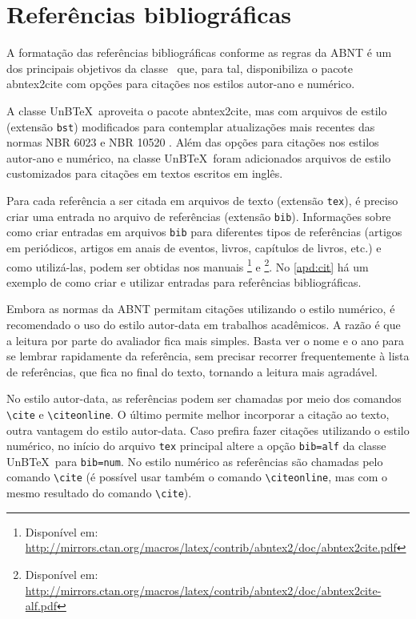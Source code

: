 \section{Referências bibliográficas}\label{sec:referencias}

A formatação das referências bibliográficas conforme as regras da ABNT é um dos principais objetivos da classe \abnTeX\ que, para tal, disponibiliza o pacote \textsf{abntex2cite} com opções para citações nos estilos autor-ano e numérico.

A classe UnB\TeX\ aproveita o pacote \textsf{abntex2cite}, mas com arquivos de estilo (extensão \texttt{bst}) modificados para contemplar atualizações mais recentes das normas NBR 6023 \cite{NBR6023:2018} e NBR 10520 \cite{NBR10520:2023}. Além das opções para citações nos estilos autor-ano e numérico, na classe UnB\TeX\ foram adicionados arquivos de estilo customizados para citações em textos escritos em inglês.

Para cada referência a ser citada em arquivos de texto (extensão \texttt{tex}), é preciso criar uma entrada no arquivo de referências (extensão \texttt{bib}). Informações sobre como criar entradas em arquivos \texttt{bib} para diferentes tipos de referências (artigos em periódicos, artigos em anais de eventos, livros, capítulos de livros, etc.) e como utilizá-las, podem ser obtidas nos manuais \footnote{Disponível em: \url{http://mirrors.ctan.org/macros/latex/contrib/abntex2/doc/abntex2cite.pdf}} e \footnote{Disponível em: \url{http://mirrors.ctan.org/macros/latex/contrib/abntex2/doc/abntex2cite-alf.pdf}}. No \cref{apd:cit} há um exemplo de como criar e utilizar entradas para referências bibliográficas.

Embora as normas da ABNT permitam citações utilizando o estilo numérico, é recomendado o uso do estilo autor-data em trabalhos acadêmicos. A razão é que a leitura por parte do avaliador fica mais simples. Basta ver o nome e o ano para se lembrar rapidamente da referência, sem precisar recorrer frequentemente à lista de referências, que fica no final do texto, tornando a leitura mais agradável.

No estilo autor-data, as referências podem ser chamadas por meio dos comandos \verb|\cite| e \verb|\citeonline|. O último permite melhor incorporar a citação ao texto, outra vantagem do estilo autor-data. Caso prefira fazer citações utilizando o estilo numérico, no início do arquivo \texttt{tex} principal altere a opção \texttt{bib=alf} da classe UnB\TeX\ para \texttt{bib=num}. No estilo numérico as referências são chamadas pelo comando \verb|\cite| (é possível usar também o comando \verb|\citeonline|, mas com o mesmo resultado do comando \verb|\cite|).

